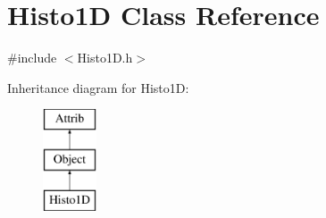 \hypertarget{classHisto1D}{}\section{Histo1D Class Reference}
\label{classHisto1D}


{\ttfamily \#include $<$Histo1\+D.\+h$>$}

Inheritance diagram for Histo1D\+:\begin{figure}[H]
\begin{center}
\leavevmode
\includegraphics[height=3.000000cm]{classHisto1D}
\end{center}
\end{figure}
